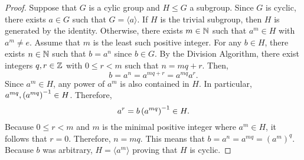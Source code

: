 \documentclass[../AlgebraQualSolutions.tex]{subfiles}
\begin{document}
	\begin{proof}
		Suppose that $G$ is a cylic group and $H \leq G$ a subgroup. Since $G$ is cyclic, there exists $a \in G$ such that $G = \langle a \rangle$. If $H$ is the trivial subgroup, then $H$ is generated by the identity. Otherwise, there exists $m \in \mathbb{N}$ such that $a^m \in H$ with $a^m \neq e$. Assume that $m$ is the least such positive integer. For any $b \in H$, there exists $n \in \mathbb{N}$ such that $b = a^n$ since $b \in G$. By the Division Algorithm, there exist integers $q,r \in \mathbb{Z}$ with $0 \leq r < m$ such that $n = mq + r$. Then,
			\[b = a^n = a^{mq+r} = a^{mq}a^r.\]
		Since $a^m \in H$, any power of $a^m$ is also contained in $H$. In particular, $a^{mq}, \left(a^{mq}\right)^{-1} \in H$. Therefore,
			\[a^r = b \left(a^{mq}\right)^{-1} \in H.\]
		Because $0 \leq r < m$ and $m$ is the minimal positive integer where $a^m \in H$, it follows that $r = 0$. Therefore, $n = mq$. This means that $b = a^n=a^{mq} = (a^m)^q$. Because $b$ was arbitrary, $H = \langle a^m \rangle$ proving that $H$ is cyclic.
	\end{proof}
\end{document}
